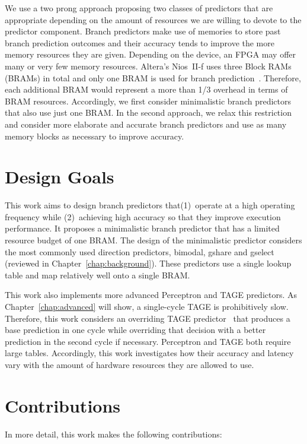 We use a two prong approach proposing two classes of predictors that are appropriate depending on the amount of resources we are willing to devote to the predictor component. Branch predictors make use of memories to store past branch prediction outcomes and their accuracy tends to improve the more memory resources they are given. Depending on the device, an FPGA may offer many or very few memory resources. Altera's Nios~II-f uses three Block RAMs (BRAMs) in total and only one BRAM is used for branch prediction~\cite{niosiif}. Therefore, each additional BRAM would represent a more than 1/3 overhead in terms of BRAM resources. Accordingly, we first consider minimalistic branch predictors that also use just one BRAM. In the second approach, we relax this restriction and consider more elaborate and accurate branch predictors and use as many memory blocks as necessary to improve accuracy.

\section{Design Goals}
\label{sec:intro:goal}

This work aims to design branch predictors that(1)~operate at a high operating frequency while (2)~achieving high accuracy so that they improve execution performance. It proposes a minimalistic branch predictor that has a limited resource budget of one BRAM. The design of the minimalistic predictor considers the most commonly used direction predictors, bimodal, gshare and gselect (reviewed in Chapter~\ref{chap:background}). These predictors use a single lookup table and map relatively well onto a single BRAM.

This work also implements more advanced Perceptron and TAGE predictors. As Chapter~\ref{chap:advanced} will show, a single-cycle TAGE is prohibitively slow. Therefore, this work considers an overriding TAGE predictor~\cite{override} that produces a base prediction in one cycle while overriding that decision with a better prediction in the second cycle if necessary. Perceptron and TAGE both require large tables. Accordingly, this work investigates how their accuracy and latency vary with the amount of hardware resources they are allowed to use.


\section{Contributions}
\label{sec:intro:contributions}

In more detail, this work makes the following contributions:


